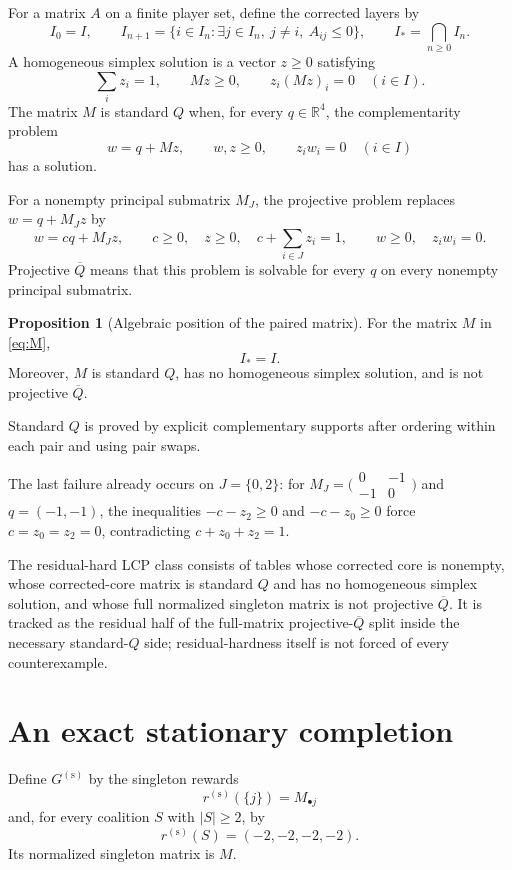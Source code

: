 \documentclass[11pt]{article}
\theoremstyle{definition}
\newtheorem{proposition}{Proposition}
\newcommand{\R}{\mathbb R}
\begin{document}
For a matrix $A$ on a finite player set, define the corrected layers by
\[
 I_0=I,
 \qquad
 I_{n+1}=\{i\in I_n:\exists j\in I_n,\ j\ne i,\ A_{ij}\le0\},
 \qquad
 I_*=\bigcap_{n\ge0}I_n.
\]
A homogeneous simplex solution is a vector $z\ge0$ satisfying
\[
 \sum_i z_i=1,
 \qquad Mz\ge0,
 \qquad z_i(Mz)_i=0\quad(i\in I).
\]
The matrix $M$ is standard $Q$ when, for every $q\in\R^4$, the
complementarity problem
\[
 w=q+Mz,
 \qquad w,z\ge0,
 \qquad z_iw_i=0\quad(i\in I)
\]
has a solution.

For a nonempty principal submatrix $M_J$, the projective problem replaces
$w=q+M_Jz$ by
\[
 w=cq+M_Jz,
 \qquad c\ge0,\quad z\ge0,\quad c+\sum_{i\in J}z_i=1,
 \qquad w\ge0,\quad z_iw_i=0.
\]
Projective $\overline Q$ means that this problem is solvable for every $q$
on every nonempty principal submatrix.

\begin{proposition}[Algebraic position of the paired matrix]
For the matrix $M$ in \eqref{eq:M},
\[
 I_*=I.
\]
Moreover, $M$ is standard $Q$, has no homogeneous simplex solution, and is
not projective $\overline Q$.
\end{proposition}

Standard $Q$ is proved by explicit complementary supports after ordering
within each pair and using pair swaps.

The last failure already occurs on $J=\{0,2\}$: for
$M_J=\bigl(\begin{smallmatrix}0&-1\\-1&0\end{smallmatrix}\bigr)$ and
$q=(-1,-1)$, the inequalities $-c-z_2\ge0$ and $-c-z_0\ge0$ force
$c=z_0=z_2=0$, contradicting $c+z_0+z_2=1$.

The residual-hard LCP class consists of tables whose corrected core is
nonempty, whose corrected-core matrix is standard $Q$ and has no homogeneous
simplex solution, and whose full normalized singleton matrix is not
projective $\overline Q$.  It is tracked as the residual half of the
full-matrix projective-$\overline Q$ split inside the necessary standard-$Q$
side; residual-hardness itself is not forced of every counterexample.

\section{An exact stationary completion}

Define $G^{(\mathrm s)}$ by the singleton rewards
\[
 r^{(\mathrm s)}(\{j\})=M_{\bullet j}
\]
and, for every coalition $S$ with $|S|\ge2$, by
\begin{equation}
\label{eq:stationary-completion}
 r^{(\mathrm s)}(S)=(-2,-2,-2,-2).
\end{equation}
Its normalized singleton matrix is $M$.
\end{document}
